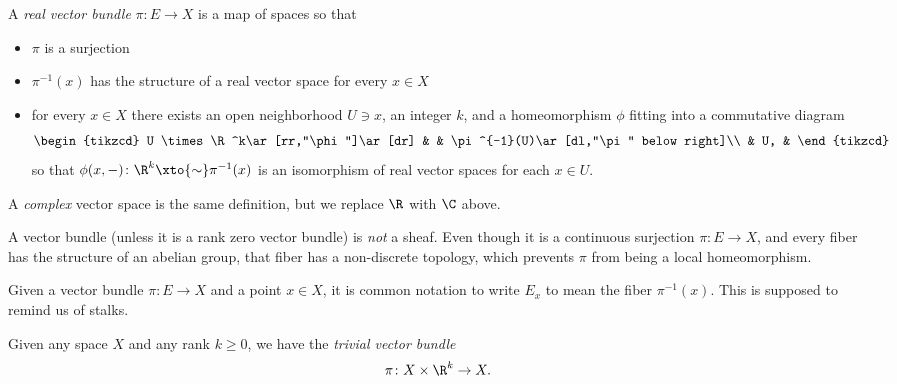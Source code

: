 \documentclass[11pt]{book}
\begin{document}
\begin{definition} A \emph{real vector bundle} $\pi \colon E \to X$ is a map of spaces so that
\begin{itemize}
    \item $\pi$ is a surjection
    \item $\pi^{-1}(x)$ has the structure of a real vector space for every $x\in X$
    \item for every $x\in X$ there exists an open neighborhood $U \ni x$, an integer $k$, and a homeomorphism $\phi$ fitting into a commutative diagram
\[ \begin{tikzcd}
    U \times \R^k\ar[rr,"\phi"]\ar[dr] &  & \pi^{-1}(U)\ar[dl,"\pi" below right]\\
     & U, &
\end{tikzcd} \]
so that $\phi(x,-) \colon \R^k \xto{\sim} \pi^{-1}(x)$ is an isomorphism of real vector spaces for each $x\in U$.
\end{itemize}
\end{definition}

A \textit{complex} vector space is the same definition, but we replace $\R$ with $\C$ above.

\begin{remark}
A vector bundle (unless it is a rank zero vector bundle) is \emph{not} a sheaf. Even though it is a continuous surjection $\pi \colon E \to X$, and every fiber has the structure of an abelian group, that fiber has a non-discrete topology, which prevents $\pi$ from being a local homeomorphism.
\end{remark}

\begin{notation} Given a vector bundle $\pi \colon E \to X$ and a point $x\in X$, it is common notation to write $E_x$ to mean the fiber $\pi^{-1}(x)$. This is supposed to remind us of stalks.
\end{notation}

\begin{example} Given any space $X$ and any rank $k\ge0$, we have the \emph{trivial vector bundle}
\begin{align*}
    \pi \colon X \times \R^k \to X.
\end{align*}
\end{example}
\end{document}
